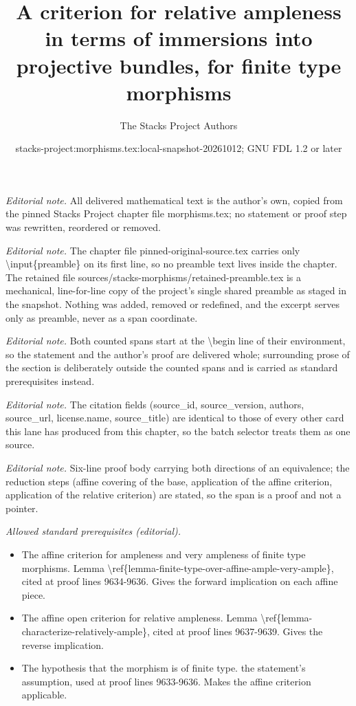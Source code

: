 \documentclass[10pt,a4paper]{amsart}
\title{A criterion for relative ampleness in terms of immersions into projective bundles, for finite type morphisms}
\author{The Stacks Project Authors}
\date{stacks-project:morphisms.tex:local-snapshot-20261012; GNU FDL 1.2 or later}
\theoremstyle{plain}
\theoremstyle{definition}
\theoremstyle{remark}
\numberwithin{equation}{subsection}
\begin{document}
\maketitle
\setcounter{subsection}{1}
\noindent\textit{Editorial note.} All delivered mathematical text is the author's own, copied from the pinned Stacks Project chapter file morphisms.tex; no statement or proof step was rewritten, reordered or removed.\par\medskip
\noindent\textit{Editorial note.} The chapter file pinned-original-source.tex carries only \textbackslash{}input\{preamble\} on its first line, so no preamble text lives inside the chapter. The retained file sources/stacks-morphisms/retained-preamble.tex is a mechanical, line-for-line copy of the project's single shared preamble as staged in the snapshot. Nothing was added, removed or redefined, and the excerpt serves only as preamble, never as a span coordinate.\par\medskip
\noindent\textit{Editorial note.} Both counted spans start at the \textbackslash{}begin line of their environment, so the statement and the author's proof are delivered whole; surrounding prose of the section is deliberately outside the counted spans and is carried as standard prerequisites instead.\par\medskip
\noindent\textit{Editorial note.} The citation fields (source\_id, source\_version, authors, source\_url, license.name, source\_title) are identical to those of every other card this lane has produced from this chapter, so the batch selector treats them as one source.\par\medskip
\noindent\textit{Editorial note.} Six-line proof body carrying both directions of an equivalence; the reduction steps (affine covering of the base, application of the affine criterion, application of the relative criterion) are stated, so the span is a proof and not a pointer.\par\medskip
\noindent\textit{Allowed standard prerequisites (editorial).}\begin{itemize}
\item The affine criterion for ampleness and very ampleness of finite type morphisms. Lemma \textbackslash{}ref\{lemma-finite-type-over-affine-ample-very-ample\}, cited at proof lines 9634-9636. Gives the forward implication on each affine piece.
\item The affine open criterion for relative ampleness. Lemma \textbackslash{}ref\{lemma-characterize-relatively-ample\}, cited at proof lines 9637-9639. Gives the reverse implication.
\item The hypothesis that the morphism is of finite type. the statement's assumption, used at proof lines 9633-9636. Makes the affine criterion applicable.
\end{itemize}\medskip
\end{document}
